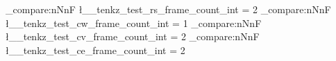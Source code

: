 \documentclass{standalone}
\begin{document}
\int_compare:nNnF { \l__tenkz_test_rs_frame_count_int } = {2}
  {  }
\int_compare:nNnF { \l__tenkz_test_cw_frame_count_int } = {1}
  {  }
\int_compare:nNnF { \l__tenkz_test_cv_frame_count_int } = {2}
  {  }
\int_compare:nNnF { \l__tenkz_test_ce_frame_count_int } = {2}
  {  }
\ExplSyntaxOff
\end{document}
